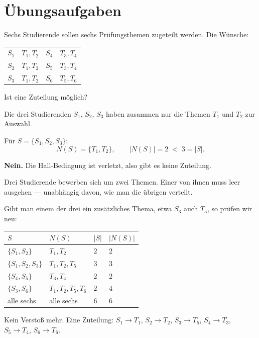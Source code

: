 \section{Übungsaufgaben}

\begin{aufgabe}
Sechs Studierende sollen sechs Prüfungsthemen zugeteilt werden. Die Wünsche:
\begin{center}
{\small
\renewcommand{\arraystretch}{1.38}
\begin{tabular}{@{}P{1.4cm}P{2.6cm}P{1.4cm}P{2.6cm}@{}}
\toprule
$S_1$ & $T_1, T_2$ & $S_4$ & $T_3, T_4$\\
$S_2$ & $T_1, T_2$ & $S_5$ & $T_3, T_4$\\
$S_3$ & $T_1, T_2$ & $S_6$ & $T_5, T_6$\\
\bottomrule
\end{tabular}}
\end{center}
Ist eine Zuteilung möglich?

\loesung
{}
Die drei Studierenden $S_1$, $S_2$, $S_3$ haben zusammen nur die Themen $T_1$ und $T_2$ zur Auswahl.

Für $S = \{S_1, S_2, S_3\}$:
\[ N(S) = \{T_1, T_2\}, \qquad |N(S)| = 2 \;<\; 3 = |S| . \]

\textbf{Nein.} Die Hall-Bedingung ist verletzt, also gibt es keine Zuteilung.

Drei Studierende bewerben sich um zwei Themen. Einer von ihnen muss leer ausgehen --- unabhängig davon, wie man die übrigen verteilt.

Gibt man einem der drei ein zusätzliches Thema, etwa $S_3$ auch $T_5$, so prüfen wir neu:
\begin{center}
{\small
\renewcommand{\arraystretch}{1.38}
\begin{tabular}{@{}P{2.6cm}P{2.6cm}P{1.0cm}P{1.2cm}@{}}
\toprule
$S$ & $N(S)$ & $|S|$ & $|N(S)|$\\
\midrule
$\{S_1,S_2\}$ & $T_1,T_2$ & $2$ & $2$\\
$\{S_1,S_2,S_3\}$ & $T_1,T_2,T_5$ & $3$ & $3$\\
$\{S_4,S_5\}$ & $T_3,T_4$ & $2$ & $2$\\
$\{S_3,S_6\}$ & $T_1,T_2,T_5,T_6$ & $2$ & $4$\\
alle sechs & alle sechs & $6$ & $6$\\
\bottomrule
\end{tabular}}
\end{center}
Kein Verstoß mehr. Eine Zuteilung: $S_1 \to T_1$, $S_2 \to T_2$, $S_3 \to T_5$, $S_4 \to T_3$, $S_5 \to T_4$, $S_6 \to T_6$. \checkmark
\end{aufgabe}

